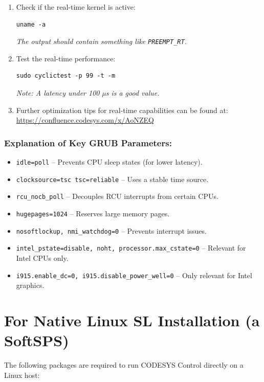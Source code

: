 \documentclass[a4paper,12pt]{article}
\begin{document}
\begin{enumerate}
\item Check if the real-time kernel is active:
\begin{lstlisting}
uname -a
\end{lstlisting}
\textit{The output should contain something like \texttt{PREEMPT\_RT}.}

\item Test the real-time performance:
\begin{lstlisting}
sudo cyclictest -p 99 -t -m
\end{lstlisting}
\textit{Note: A latency under 100 µs is a good value.}

\item Further optimization tips for real-time capabilities can be found at: \\ 
\url{https://confluence.codesys.com/x/AoNZEQ}
\end{enumerate}

\subsubsection*{Explanation of Key GRUB Parameters:}
\begin{itemize}
\item \texttt{idle=poll} – Prevents CPU sleep states (for lower latency).
\item \texttt{clocksource=tsc tsc=reliable} – Uses a stable time source.
\item \texttt{rcu\_nocb\_poll} – Decouples RCU interrupts from certain CPUs.
\item \texttt{hugepages=1024} – Reserves large memory pages.
\item \texttt{nosoftlockup, nmi\_watchdog=0} – Prevents interrupt issues.
\item \texttt{intel\_pstate=disable, noht, processor.max\_cstate=0} – Relevant for Intel CPUs only.
\item \texttt{i915.enable\_dc=0, i915.disable\_power\_well=0} – Only relevant for Intel graphics.
\end{itemize}
\newpage


\section{For Native Linux SL Installation (a SoftSPS)}

The following packages are required to run CODESYS Control directly on a Linux host:
\end{document}
